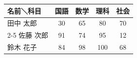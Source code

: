 \documentclass{ltjsarticle}
\begin{document}
\begin{table}[htbp]
  \begin{tabular}{|l||c|c|c|c|}
    \hline
    名前＼科目 & 国語 & 数学 & 理科 & 社会 \\
    \hline \hline
    田中 太郎 & 30 & 65 & 80 & 70 \\
    \cline{2-5}
    佐藤 次郎 & 91 & 74 & 95 & 12 \\
    \hline
    鈴木 花子 & 84 & 98 & 100 & 68 \\
    \hline
  \end{tabular}
\end{table}
\end{document}
